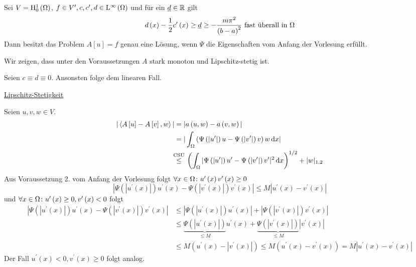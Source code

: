 \begin{lemma}[Korollar]
	Sei $V=\mathrm{H}^{1}_{0}\left(\Omega\right)$, $f\in V^{\prime}, c,c^{\prime},d\in\mathrm{L}^{\infty}\left(\Omega\right)$ und für ein $\underline{d}\in\mathbb{R}$ gilt
	\begin{equation*}
		d\left(x\right)-\frac{1}{2}c^{\prime}\left(x\right)\geq\underline{d}\geq -\frac{m\pi^{2}}{\left(b-a\right)^{2}} \text{ fast überall in } \Omega
	\end{equation*}
	Dann besitzt das Problem $A[u]=f$ genau eine Lösung, wenn $\Psi$ die Eigenschaften vom Anfang der Vorlesung erfüllt.
\end{lemma}
\begin{prf}
	Wir zeigen, dass unter den Voraussetzungen $A$ stark monoton und Lipschitz-stetig ist.
	
	Seien $c\equiv d\equiv 0$. Ansonsten folge dem linearen Fall.
	
	\underline{Lipschitz-Stetigkeit}
	
	Seien $u,v,w\in V$.
	\begin{align*}
		|\left<A\left[u\right]-A\left[v\right],w\right>| &= |a\left(u,w\right)-a\left(v,w\right)|\\
			&= |\int_{\W}\left(\Psi\left(|u^{\prime}|\right)u-\Psi\left(|v^{\prime}|\right)v\right)w\d x|\\
			&\overset{\mathclap{\text{CSU}}}{\leq}\hspace*{0.5em}\left(\int_{\W}|\Psi\left(|u^{\prime}|\right)u^{\prime}-\Psi\left(|v^{\prime}|\right)v^{\prime}|^{2}\d x\right)^{1/2} + |w|_{1,2}
	\end{align*}
	Aus Voraussetzung 2. vom Anfang der Vorlesung folgt $\forall x\in\Omega\colon u^{\prime}\left(x\right)v^{\prime}\left(x\right)\geq 0$
	\begin{equation*}
		|\Psi\left(|u^{\prime}\left(x\right)|\right)u^{\prime}\left(x\right)-\Psi\left(|v^{\prime}\left(x\right)|\right)v^{\prime}\left(x\right)|\leq M|u^{\prime}\left(x\right)-v^{\prime}\left(x\right)|
	\end{equation*}
	und $\forall x\in\Omega\colon u^{\prime}\left(x\right)\geq 0, v^{\prime}\left(x\right)<0$ folgt
	\begin{align*}
		|\Psi\left(|u^{\prime}\left(x\right)|\right)u^{\prime}\left(x\right)-\Psi\left(|v^{\prime}\left(x\right)|\right)v^{\prime}\left(x\right)| &\leq |\Psi\left(|u^{\prime}\left(x\right)|\right)u^{\prime}\left(x\right)| + |\Psi\left(|v^{\prime}\left(x\right)|\right)v^{\prime}\left(x\right)|\\
		&\leq \underbrace{\Psi\left(|u^{\prime}\left(x\right)|\right)}_{\leq M}u^{\prime}\left(x\right) + \underbrace{\Psi\left(|v^{\prime}\left(x\right)|\right)}_{\leq M}|v^{\prime}\left(x\right)|\\
		&\leq M\left(u^{\prime}\left(x\right)-|v^{\prime}\left(x\right)|\right) \leq M\left(u^{\prime}\left(x\right)-v^{\prime}\left(x\right)\right) = M|u^{\prime}\left(x\right)-v^{\prime}\left(x\right)|
	\end{align*}
	Der Fall $u^{\prime}\left(x\right)< 0, v^{\prime}\left(x\right)\geq 0$ folgt analog.
\end{prf}
